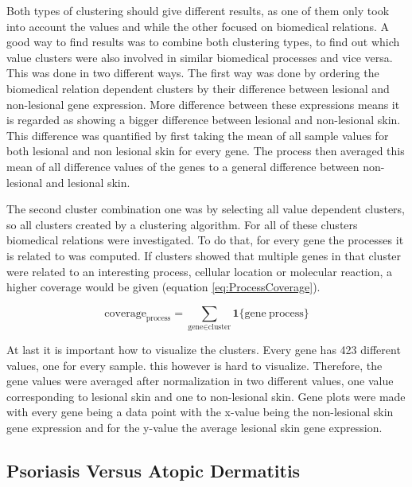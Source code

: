 \documentclass[10pt,a4paper]{report}
\begin{document}
	Both types of clustering should give different results, as one of them only took into account the values and while the other focused on biomedical relations. A good way to find results was to combine both clustering types, to find out which value clusters were also involved in similar biomedical processes and vice versa. This was done in two different ways. The first way was done by ordering the biomedical relation dependent clusters by their difference between lesional and non-lesional gene expression. More difference between these expressions means it is regarded as showing a bigger difference between lesional and non-lesional skin. This difference was quantified by first taking the mean of all sample values for both lesional and non lesional skin for every gene. The process then averaged this mean of all difference values of the genes to a general difference between non-lesional and lesional skin.
	
	The second cluster combination one was by selecting all value dependent clusters, so all clusters created by a clustering algorithm. For all of these clusters biomedical relations were investigated. To do that, for every gene the processes it is related to was computed. If clusters showed that multiple genes in that cluster were related to an interesting process, cellular location or molecular reaction, a higher coverage would be given (equation \ref{eq:ProcessCoverage}).
	
	\begin{equation}\label{eq:ProcessCoverage}
	\text{coverage}_{\text{process}} = \sum_{\text{gene} \in \text{cluster}} \textbf{1}\{\text{gene} ~ \text{process}\}
	\end{equation}
	
	At last it is important how to visualize the clusters. Every gene has 423 different values, one for every sample. this however is hard to visualize. Therefore, the gene values were averaged after normalization in two different values, one value corresponding to lesional skin and one to non-lesional skin. Gene plots were made with every gene being a data point with the x-value being the non-lesional skin gene expression and for the y-value the average lesional skin gene expression.
	
	\subsection{Psoriasis Versus Atopic Dermatitis}
	\label{subsec:MethodsPsoriasisVersusAtopicDermatitis}
	
\end{document}
